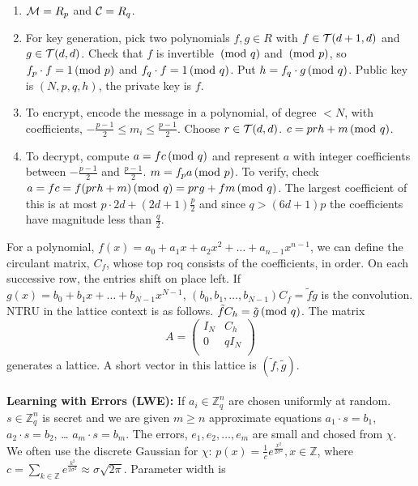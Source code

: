 \begin{enumerate}
\item ${\cal M} = R_p$ and ${\cal C} = R_q$.
\item For key generation, pick two polynomials $f, g \in R$ with $f \in {\cal T}(d+1, d)$ and
$g \in {\cal T}(d,d)$.  Check that $f$ is invertible $\thinspace \textnormal{(mod } q \textnormal{)}$ and $\thinspace \textnormal{(mod } p \textnormal{)}$, so
$f_p \cdot f = 1 \thinspace \textnormal{(mod } p \textnormal{)}$ and
$f_q \cdot f = 1 \thinspace \textnormal{(mod } q \textnormal{)}$.  Put $h = f_q \cdot g \thinspace \textnormal{(mod } q \textnormal{)}$.
Public key is $(N, p, q,h)$, the private key is $f$.
\item To encrypt, encode the message in a polynomial, of degree $<N$, with coefficients,
$-{\frac {p-1} 2} \leq m_i \leq {\frac {p-1} 2}$.  Choose $r \in {\cal T}(d,d)$.
$c = prh+m \thinspace \textnormal{(mod } q \textnormal{)}$.
\item To decrypt, compute $a = fc \thinspace \textnormal{(mod } q \textnormal{)}$ and represent $a$ with integer coefficients between
$-{\frac {p-1} 2}$ and ${\frac {p-1} 2}$.  $m = f_p a \thinspace \textnormal{(mod } p \textnormal{)}$.  To verify, check
$a=fc=f(prh+m) \thinspace \textnormal{(mod } q \textnormal{)} = prg + fm \thinspace \textnormal{(mod } q \textnormal{)}$.  The largest coefficient of this is at most
$p\cdot 2d + (2d+1){\frac p 2}$ and since $q > (6d+1)p$ the coefficients have magnitude less than ${\frac q 2}$.
\end{enumerate}
For a polynomial, $f(x) = a_0 + a_1 x + a_2 x^2 + \ldots + a_{n-1} x^{n-1}$, we can define the circulant matrix,
$C_f$, whose top roq consists of the coefficients, in order.  On each successive row, the entries shift on place left.
If $g(x) = b_0 + b_ 1 x + \ldots + b_{N-1} x^{N-1}$, $(b_0, b_1, \ldots , b_{N-1}) C_f = \tilde{f} \tilde{g}$ is the convolution.
NTRU in the lattice context is as follows. $\tilde{f}C_h = \tilde{g} \thinspace \textnormal{(mod } q \textnormal{)}$.  The matrix
$$
A=
\left(
\begin{array}{cc}
I_N & C_h \\
0 & q I_N \\
\end{array}
\right)
$$
generates a lattice.
A short vector in this lattice is $(\tilde{f}, \tilde{g})$.
\\
\\
{\bf Learning with Errors (LWE): }  If $a_i \in {\mathbb Z}_q^n$ are chosen uniformly at random.
$s \in {\mathbb Z}_q^n$ is secret and we are given $m \geq n$ approximate equations
$a_1 \cdot s = b_1$,
$a_2 \cdot s = b_2$,
\ldots
$a_m \cdot s = b_m$.  The errors, $e_1, e_2, \ldots, e_m$ are small and chosed from $\chi$.
We often use the discrete Gaussian for $\chi$: $p(x) = {\frac 1 c} e^{\frac {x^2}{2 \sigma^2}}, x \in {\mathbb Z}$,
where $c = \sum_{k \in {\mathbb Z}} e^{\frac {k^2}{2 \sigma^2}} \approx \sigma \sqrt{2 \pi}$.  Parameter width is
